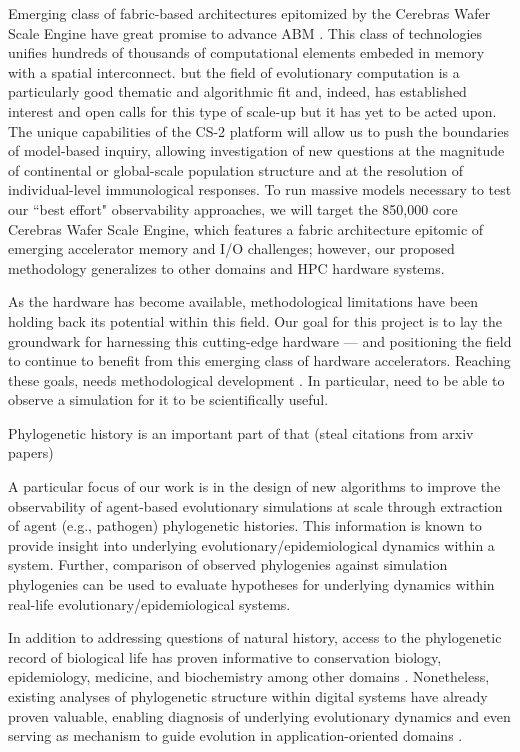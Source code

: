 Emerging class of fabric-based architectures epitomized by the Cerebras Wafer Scale Engine have great promise to advance ABM \citep{lauterbach2021path,lie2022cerebras}.
This class of technologies unifies hundreds of thousands of computational elements embeded in memory with a spatial interconnect.
but the field of evolutionary computation is a particularly good thematic and algorithmic fit and, indeed, has established interest and open calls for this type of scale-up but it has yet to be acted upon.
The unique capabilities of the CS-2 platform will allow us to push the boundaries of model-based inquiry, allowing investigation of new questions at the magnitude of continental or global-scale population structure and at the resolution of individual-level immunological responses.
To run massive models necessary to test our ``best effort" observability approaches, we will target the 850,000 core Cerebras Wafer Scale Engine, which features a fabric architecture epitomic of emerging accelerator memory and I/O challenges; however, our proposed methodology generalizes to other domains and HPC hardware systems.

As the hardware has become available, methodological limitations have been holding back its potential within this field.
Our goal for this project is to lay the groundwark for harnessing this cutting-edge hardware --- and positioning the field to continue to benefit from this emerging class of hardware accelerators.
Reaching these goals, needs methodological development .
In particular, need to be able to observe a simulation for it to be scientifically useful.

Phylogenetic history is an important part of that (steal citations from arxiv papers)

A particular focus of our work is in the design of new algorithms to improve the observability of agent-based evolutionary simulations at scale through extraction of agent (e.g., pathogen) phylogenetic histories.
This information is known to provide insight into underlying evolutionary/epidemiological dynamics within a system.
Further, comparison of observed phylogenies against simulation phylogenies can be used to evaluate hypotheses for underlying dynamics within real-life evolutionary/epidemiological systems.

In addition to addressing questions of natural history, access to the phylogenetic record of biological life has proven informative to conservation biology, epidemiology, medicine, and biochemistry among other domains \citep{faithConservationEvaluationPhylogenetic1992, STAMATAKIS2005phylogenetics, frenchHostPhylogenyShapes2023,kim2006discovery}.
Nonetheless, existing analyses of phylogenetic structure within digital systems have already proven valuable, enabling diagnosis of underlying evolutionary dynamics \citep{moreno2023toward,hernandez2022can,shahbandegan2022untangling, lewinsohnStatedependentEvolutionaryModels2023a} and even serving as mechanism to guide evolution in application-oriented domains \citep{lalejini2024phylogeny,lalejini2024runtime,murphy2008simple,burke2003increased}.

